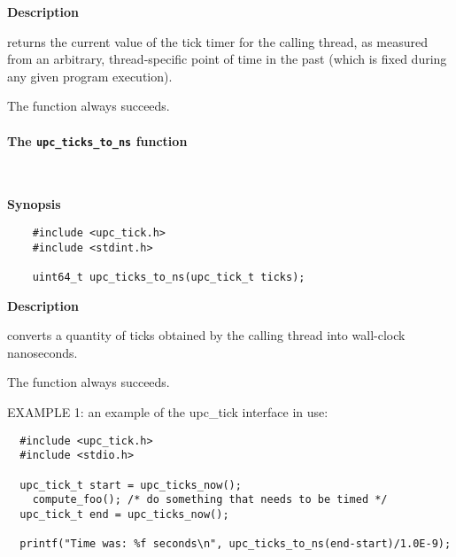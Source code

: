 {\bf Description}

 returns the current value of the tick timer for the calling thread,
as measured from an arbitrary, thread-specific point of time in the past (which is fixed
during any given program execution).

\np The function always succeeds.

\paragraph{The {\tt upc\_ticks\_to\_ns} function}\ \\
\label{upc-ticks-to-ns}

{\bf Synopsis}

\npf\vspace{-2.5em}
 \begin{verbatim}
    #include <upc_tick.h>
    #include <stdint.h>

    uint64_t upc_ticks_to_ns(upc_tick_t ticks);
\end{verbatim}

{\bf Description}

 converts a quantity of ticks obtained by the
calling thread into wall-clock nanoseconds.

\np The function always succeeds.

\np EXAMPLE 1: an example of the upc\_tick interface in use:
\begin{verbatim}
  #include <upc_tick.h>
  #include <stdio.h>

  upc_tick_t start = upc_ticks_now();
    compute_foo(); /* do something that needs to be timed */
  upc_tick_t end = upc_ticks_now();

  printf("Time was: %f seconds\n", upc_ticks_to_ns(end-start)/1.0E-9);
\end{verbatim}

\pagebreak
\appendix
